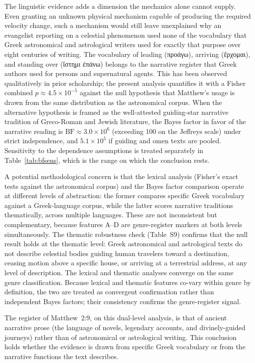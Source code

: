 \documentclass[11pt,a4paper]{article}
\newcommand{\grk}[1]{{\fontencoding{LGR}\selectfont #1}}
\newcommand{\grk}[1]{{\greekfont #1}}
\begin{document}
The linguistic evidence adds a dimension the mechanics alone cannot supply.
Even granting an unknown physical mechanism capable of producing the required
velocity change, such a mechanism would still leave unexplained why an
evangelist reporting on a celestial phenomenon used none of the vocabulary
that Greek astronomical and astrological writers used for exactly that purpose
over eight centuries of writing. The vocabulary of leading (\grk{προάγω}),
arriving (\grk{ἔρχομαι}), and standing over (\grk{ἵστημι ἐπάνω}) belongs to
the narrative register that Greek authors used for persons and supernatural
agents. This has been observed qualitatively in prior
scholarship\cite{adair2012,adair_jsnt}; the present analysis quantifies it
with a Fisher combined $p \approx 4.5\times10^{-5}$ against the null hypothesis
that Matthew's usage is drawn from the same distribution as the astronomical
corpus. When the alternative hypothesis is framed as the well-attested
guiding-star narrative tradition of Greco-Roman and Jewish literature, the
Bayes factor in favor of the narrative reading is $\mathrm{BF} \approx 3.0\times10^{6}$
(exceeding 100 on the Jeffreys scale) under strict independence, and
$5.1\times10^{5}$ if guiding and omen texts are pooled. Sensitivity to the
dependence assumptions is treated separately in
Table~\ref{tab:bfsens}, which is the range on which the conclusion rests.

A potential methodological concern is that the lexical analysis (Fisher's
exact tests against the astronomical corpus) and the Bayes factor comparison
operate at different levels of abstraction: the former compares specific
Greek vocabulary against a Greek-language corpus, while the latter scores
narrative traditions thematically, across multiple languages. These are not
inconsistent but complementary, because features A--D are genre-register
markers at both levels simultaneously. The thematic robustness check
(Table~S9) confirms that the null result holds at the thematic level:
Greek astronomical and astrological texts do not describe celestial bodies
guiding human travelers toward a destination, ceasing motion above a
specific house, or arriving at a terrestrial address, at any level of
description. The lexical and thematic analyses converge on the same genre
classification. Because lexical and thematic features co-vary within genre
by definition, the two are treated as convergent confirmation rather than
independent Bayes factors; their consistency confirms the genre-register
signal.

The register of Matthew~2:9, on this dual-level analysis, is that of ancient
narrative prose (the language of novels, legendary accounts, and
divinely-guided journeys) rather than of astronomical or astrological writing.
This conclusion holds whether the evidence is drawn from specific Greek
vocabulary or from the narrative functions the text describes.
\end{document}
